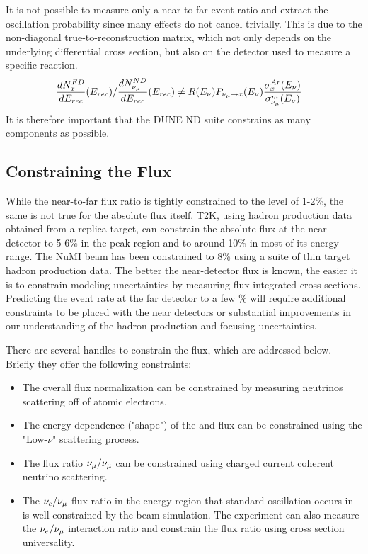 It is not possible to measure only a near-to-far event ratio and extract the oscillation probability since many effects do not cancel trivially.  This is due to the non-diagonal true-to-reconstruction matrix, which not only depends on the underlying differential cross section, but also on the detector used to measure a specific reaction.
\begin{align*}
\frac{dN^{FD}_{x}}{dE_{rec}}(E_{rec})/{\frac{dN^{ND}_{\nu_\mu}}{dE_{rec}}(E_{rec})} & \neq  R(E_\nu)P_{\nu_\mu\rightarrow x}(E_\nu)\frac{\sigma^{Ar}_x(E_\nu)}{\sigma^{m}_{\nu_\mu}(E_\nu)}
\end{align*}
It is therefore important that the DUNE ND suite constrains as many components as possible.

\subsection{Constraining the Flux}
\label{sec:flux}
While the near-to-far flux ratio is tightly constrained to the level of 1-2\%, the same is not true for the absolute flux itself. T2K, using hadron production data obtained from a replica target, can constrain the absolute flux at the near detector to 5-6\% in the peak region and to around 10\% in most of its energy range. The NuMI beam has been constrained to 8\% using a suite of thin target hadron production data. The better the near-detector flux is known, the easier it is to constrain modeling uncertainties by measuring flux-integrated cross sections. Predicting the event rate at the far detector to a few \% will require additional constraints to be placed with the near detectors or substantial improvements in our understanding of the hadron production and focusing uncertainties. 

There are several handles to constrain the flux, which are addressed below. Briefly they offer the following constraints:

\begin{itemize}
    \item The overall flux normalization can be constrained by measuring neutrinos scattering off of atomic electrons.
    \item The energy dependence ("shape") of the \numu and \anumu %
     flux can be constrained using the "Low-$\nu$" scattering process.
    \item The flux ratio $\bar\nu_\mu/\nu_\mu$ can be constrained using charged current coherent neutrino scattering.
    \item The $\nu_e/\nu_\mu$ flux ratio in the energy region that standard oscillation occurs in is well constrained by the beam simulation. The experiment can also measure the $\nu_e/\nu_\mu$ interaction ratio and constrain the flux ratio using cross section universality.
\end{itemize}


